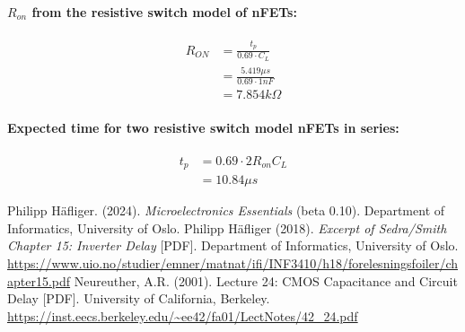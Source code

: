 \documentclass[onecolumn]{article}
\begin{document}
\paragraph{$R_{on}$ from the resistive switch model of nFETs:}
\begin{align}
    R_{ON} &= \frac{t_p}{0.69 \cdot C_L} \nonumber \\
    &= \frac{5.419\mu s}{0.69 \cdot 1 nF} \nonumber \\
    &= 7.854 k\Omega \nonumber
\end{align}
\paragraph{Expected time for two resistive switch model nFETs in series:}
\begin{align}
  t_p &= 0.69\cdot 2R_{on}C_L \nonumber \\
  &= 10.84 \mu s \nonumber
\end{align}

\begin{thebibliography}{9}
 Philipp Häfliger. (2024). \textit{Microelectronics Essentials} (beta 0.10). Department of Informatics, University of Oslo.
 Philipp Häfliger (2018). \textit{Excerpt of Sedra/Smith Chapter 15: Inverter Delay} [PDF].  Department of Informatics, University of Oslo. \url{https://www.uio.no/studier/emner/matnat/ifi/INF3410/h18/forelesningsfoiler/chapter15.pdf}
 Neureuther, A.R. (2001). Lecture 24: CMOS Capacitance and Circuit Delay [PDF]. University of California, Berkeley. \url{https://inst.eecs.berkeley.edu/~ee42/fa01/LectNotes/42_24.pdf}
\end{thebibliography}
\end{document}
